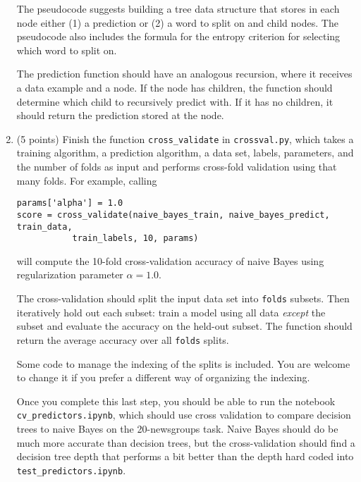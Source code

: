 \documentclass[10pt]{article}
\begin{document}
\begin{enumerate}
The pseudocode suggests building a tree data structure that stores in each node either (1) a prediction or (2) a word to split on and child nodes. The pseudocode also includes the formula for the entropy criterion for selecting which word to split on. 

The prediction function should have an analogous recursion, where it receives a data example and a node. If the node has children, the function should determine which child to recursively predict with. If it has no children, it should return the prediction stored at the node. 

\item (5 points) Finish the function \texttt{cross\_validate} in \texttt{crossval.py}, which takes a training algorithm, a prediction algorithm, a data set, labels, parameters, and the number of folds as input and performs cross-fold validation using that many folds. For example, calling
\begin{verbatim}
params['alpha'] = 1.0
score = cross_validate(naive_bayes_train, naive_bayes_predict, train_data, 
           train_labels, 10, params)
\end{verbatim}
will compute the 10-fold cross-validation accuracy of naive Bayes using regularization parameter $\alpha = 1.0$. 

The cross-validation should split the input data set into \texttt{folds} subsets. Then iteratively hold out each subset: train a model using all data \textit{except} the subset and evaluate the accuracy on the held-out subset. The function should return the average accuracy over all \texttt{folds} splits. 

Some code to manage the indexing of the splits is included. You are welcome to change it if you prefer a different way of organizing the indexing.

Once you complete this last step, you should be able to run the notebook \texttt{cv\_predictors.ipynb}, which should use cross validation to compare decision trees to naive Bayes on the 20-newsgroups task. Naive Bayes should do be much more accurate than decision trees, but the cross-validation should find a decision tree depth that performs a bit better than the depth hard coded into \texttt{test\_predictors.ipynb}.

\end{enumerate}
\end{document}
